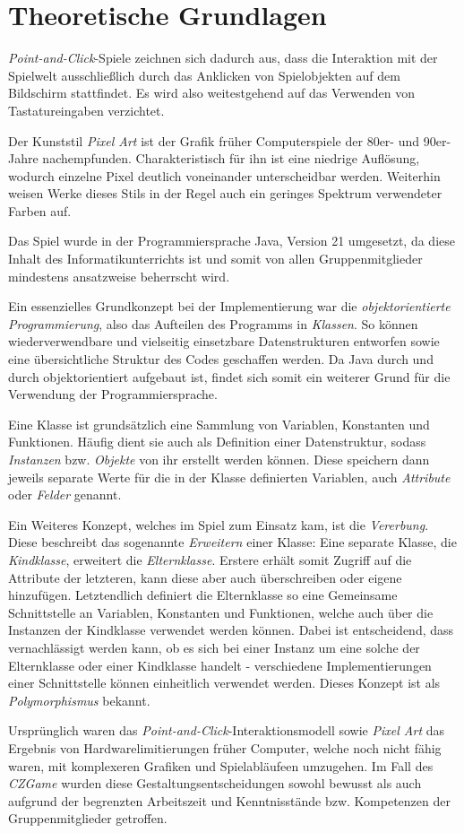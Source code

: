 \chapter{Theoretische Grundlagen}

\textit{Point-and-Click}-Spiele zeichnen sich dadurch aus, dass die Interaktion
mit der Spielwelt ausschließlich durch das Anklicken von Spielobjekten auf dem
Bildschirm stattfindet. Es wird also weitestgehend auf das Verwenden von
Tastatureingaben verzichtet.

Der Kunststil \textit{Pixel Art} ist der Grafik früher Computerspiele der
80er- und 90er-Jahre nachempfunden. Charakteristisch für ihn ist eine niedrige
Auflösung, wodurch einzelne Pixel deutlich voneinander unterscheidbar werden.
Weiterhin weisen Werke dieses Stils in der Regel auch ein geringes Spektrum
verwendeter Farben auf.

Das Spiel wurde in der Programmiersprache Java, Version 21 umgesetzt,
da diese Inhalt des Informatikunterrichts ist und somit von allen Gruppenmitglieder mindestens
ansatzweise beherrscht wird.

Ein essenzielles Grundkonzept bei der Implementierung war die \textit{objektorientierte Programmierung},
also das Aufteilen des Programms in \textit{Klassen}. So können wiederverwendbare und vielseitig
einsetzbare Datenstrukturen entworfen sowie eine übersichtliche Struktur des Codes geschaffen werden.
Da Java durch und durch objektorientiert aufgebaut ist, findet sich somit ein weiterer Grund
für die Verwendung der Programmiersprache.

Eine Klasse ist grundsätzlich eine Sammlung von Variablen, Konstanten und Funktionen.
Häufig dient sie auch als Definition einer Datenstruktur, sodass \textit{Instanzen}
bzw. \textit{Objekte} von ihr erstellt werden können. Diese speichern dann
jeweils separate Werte für die in der Klasse definierten Variablen, auch \textit{Attribute}
oder \textit{Felder} genannt.

Ein Weiteres Konzept, welches im Spiel zum Einsatz kam, ist die \textit{Vererbung}.
Diese beschreibt das sogenannte \textit{Erweitern} einer Klasse: Eine separate
Klasse, die \textit{Kindklasse}, erweitert die \textit{Elternklasse}. Erstere
erhält somit Zugriff auf die Attribute der letzteren, kann diese aber auch
überschreiben oder eigene hinzufügen. Letztendlich definiert die Elternklasse
so eine Gemeinsame Schnittstelle an Variablen, Konstanten und Funktionen,
welche auch über die Instanzen der Kindklasse verwendet werden können. Dabei
ist entscheidend, dass vernachlässigt werden kann, ob es sich bei einer Instanz
um eine solche der Elternklasse oder einer Kindklasse handelt - verschiedene
Implementierungen einer Schnittstelle können einheitlich verwendet werden. Dieses
Konzept ist als \textit{Polymorphismus} bekannt.

Ursprünglich waren das \textit{Point-and-Click}-Interaktionsmodell sowie
\textit{Pixel Art} das Ergebnis von Hardwarelimitierungen früher Computer,
welche noch nicht fähig waren, mit komplexeren Grafiken und Spielabläufeen
umzugehen. Im Fall des \textit{CZGame} wurden diese Gestaltungsentscheidungen
sowohl bewusst als auch aufgrund der begrenzten Arbeitszeit und Kenntnisstände
bzw. Kompetenzen der Gruppenmitglieder getroffen.
